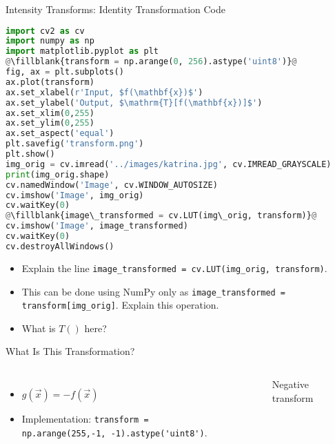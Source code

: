 \begin{frame}{Intensity Transforms: Identity Transformation Code}
    \begin{lstlisting}[caption=Identity Transformation, language=Python, escapechar=\@]
%matplotlib inline
import cv2 as cv
import numpy as np
import matplotlib.pyplot as plt
@\fillblank{transform = np.arange(0, 256).astype('uint8')}@
fig, ax = plt.subplots()
ax.plot(transform)
ax.set_xlabel(r'Input, $f(\mathbf{x})$')
ax.set_ylabel('Output, $\mathrm{T}[f(\mathbf{x})]$')
ax.set_xlim(0,255)
ax.set_ylim(0,255)
ax.set_aspect('equal')
plt.savefig('transform.png')
plt.show()
img_orig = cv.imread('../images/katrina.jpg', cv.IMREAD_GRAYSCALE)
print(img_orig.shape)
cv.namedWindow('Image', cv.WINDOW_AUTOSIZE)
cv.imshow('Image', img_orig)
cv.waitKey(0)
@\fillblank{image\_transformed = cv.LUT(img\_orig, transform)}@
cv.imshow('Image', image_transformed)
cv.waitKey(0)
cv.destroyAllWindows()
    \end{lstlisting}

\begin{itemize}
    \item Explain the line \lstinline!image_transformed = cv.LUT(img_orig, transform)!.
    \item This can be done using NumPy only as \lstinline!image_transformed = transform[img_orig]!. Explain this operation.
    \item What is $T()$ here?
\end{itemize}

\end{frame}


\begin{frame}{What Is This Transformation?}
    \begin{columns}[t]
        \begin{itemize}[<+->]
          \item $g(\vec{x}) = - f(\vec{x})$
          \item Implementation: \lstinline!transform = np.arange(255,-1, -1).astype('uint8')!.
        \end{itemize}
        \begin{figure}
          \centering
            
          \caption{Negative transform}
        \end{figure}
    \end{columns}

\end{frame}




